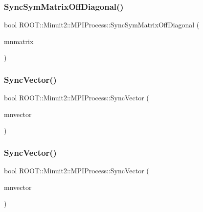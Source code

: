 \subsubsection{\texorpdfstring{SyncSymMatrixOffDiagonal()}{SyncSymMatrixOffDiagonal()}\hspace{0.1cm}{\footnotesize\ttfamily [2/2]}}
{\footnotesize\ttfamily bool R\+O\+O\+T\+::\+Minuit2\+::\+M\+P\+I\+Process\+::\+Sync\+Sym\+Matrix\+Off\+Diagonal (\begin{DoxyParamCaption}\item[{\mbox{\hyperlink{namespaceROOT_1_1Minuit2_a9e74ad97f5537a2e80e52b04d98ecc6e}{R\+O\+O\+T\+::\+Minuit2\+::\+Mn\+Algebraic\+Sym\+Matrix}} \&}]{mnmatrix }\end{DoxyParamCaption})}

\mbox{\label{classROOT_1_1Minuit2_1_1MPIProcess_a179f3ea817399a73cbce05d1778ec128}} 
\subsubsection{\texorpdfstring{SyncVector()}{SyncVector()}\hspace{0.1cm}{\footnotesize\ttfamily [1/2]}}
{\footnotesize\ttfamily bool R\+O\+O\+T\+::\+Minuit2\+::\+M\+P\+I\+Process\+::\+Sync\+Vector (\begin{DoxyParamCaption}\item[{\mbox{\hyperlink{namespaceROOT_1_1Minuit2_a62ed97730a1ca8d3fbaec64a19aa11c9}{R\+O\+O\+T\+::\+Minuit2\+::\+Mn\+Algebraic\+Vector}} \&}]{mnvector }\end{DoxyParamCaption})}

\mbox{\label{classROOT_1_1Minuit2_1_1MPIProcess_a179f3ea817399a73cbce05d1778ec128}} 
\subsubsection{\texorpdfstring{SyncVector()}{SyncVector()}\hspace{0.1cm}{\footnotesize\ttfamily [2/2]}}
{\footnotesize\ttfamily bool R\+O\+O\+T\+::\+Minuit2\+::\+M\+P\+I\+Process\+::\+Sync\+Vector (\begin{DoxyParamCaption}\item[{\mbox{\hyperlink{namespaceROOT_1_1Minuit2_a62ed97730a1ca8d3fbaec64a19aa11c9}{R\+O\+O\+T\+::\+Minuit2\+::\+Mn\+Algebraic\+Vector}} \&}]{mnvector }\end{DoxyParamCaption})}

